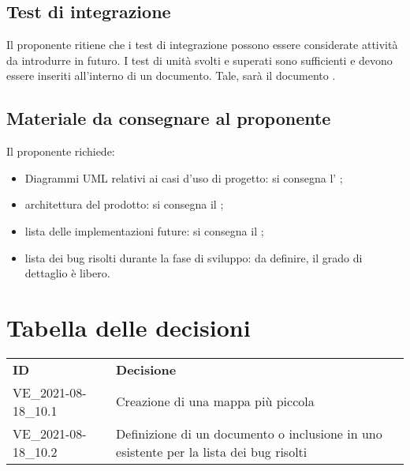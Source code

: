 \documentclass[]{article}
\begin{document}
	\subsection{Test di integrazione}
	Il proponente ritiene che i test di integrazione possono essere considerate attività da introdurre in futuro. I test di unità svolti e superati sono sufficienti e devono essere inseriti all'interno di un documento. Tale, sarà il documento .
	
	\subsection{Materiale da consegnare al proponente}
	Il proponente richiede:
	\begin{itemize}
		\item Diagrammi UML relativi ai casi d'uso di progetto: si consegna l' ;
		\item architettura del prodotto: si consegna il ;
		\item lista delle implementazioni future: si consegna il ;
		\item lista dei bug risolti durante la fase di sviluppo: da definire, il grado di dettaglio è libero.
	\end{itemize}
	
	
	
	\newpage

	\section{Tabella delle decisioni}

	\begin{table} [h!]
		\begin{center}
			\begin{tabular} { m{4cm} m{14cm} }
				\rowcolor{lightgray}
				\textbf{ID} & \textbf{Decisione}\\
				VE\_2021-08-18\_10.1 & Creazione di una mappa più piccola\\
					VE\_2021-08-18\_10.2 & Definizione di un documento o inclusione in uno esistente per la lista dei bug risolti \\
			\end{tabular}
		\end{center}
	\end{table}
\end{document}

